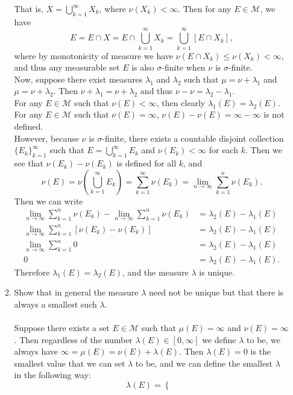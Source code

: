 \begin{enumerate}
\begin{enumerate}[label=(\roman*),align=left]
		That is, $X=\bigcup_{k=1}^\infty X_k$, where $\nu(X_k)<\infty$.
		Then for any $E\in\mathcal{M}$, we have 
		\[
			E=E\cap X = E\cap \bigcup_{k=1}^\infty X_k = \bigcup_{k=1}^\infty[E\cap X_k],
		\]
		where by monotonicity of measure we have $\nu(E\cap X_k)\le\nu(X_k)<\infty$, and thus any measurable set $E$ is also $\sigma$-finite when $\nu$ is $\sigma$-finite.
		\\Now, suppose there exist measures $\lambda_1$ and $\lambda_2$ such that $\mu=\nu+\lambda_1$ and $\mu=\nu+\lambda_2$.
		Then $\nu+\lambda_1=\nu+\lambda_2$ and thus $\nu-\nu=\lambda_2-\lambda_1$.
		\\For any $E\in\mathcal{M}$ such that $\nu(E)<\infty$, then clearly $\lambda_1(E)=\lambda_2(E)$.
		\\For any $E\in\mathcal{M}$ such that $\nu(E)=\infty$, $\nu(E)-\nu(E)=\infty-\infty$ is not defined. 
		\\However, because $\nu$ is $\sigma$-finite, there exists a countable disjoint collection $\{E_k\}_{k=1}^\infty$ such that $E=\bigcup_{k=1}^\infty E_k$ and $\nu(E_k)<\infty$ for each $k$. 
		Then we see that $\nu(E_k)-\nu(E_k)$ is defined for all $k$, and
		\[
			\nu(E)=\nu(\bigcup_{k=1}^\infty E_k)=\sum_{k=1}^\infty \nu(E_k)=\lim_{n\to\infty}\sum_{k=1}^n \nu(E_k).
		\] 
		Then we can write 
		\begin{align*}
			\lim_{n\to\infty}\sum_{k=1}^n \nu(E_k)-\lim_{n\to\infty}\sum_{k=1}^n \nu(E_k)&=\lambda_2(E)-\lambda_1(E)\\
			\lim_{n\to\infty}\sum_{k=1}^n [\nu(E_k)-\nu(E_k)]&=\lambda_2(E)-\lambda_1(E)\\
			\lim_{n\to\infty}\sum_{k=1}^n 0&=\lambda_2(E)-\lambda_1(E)\\
			0&=\lambda_2(E)-\lambda_1(E).
		\end{align*}
		Therefore $\lambda_1(E)=\lambda_2(E)$, and the measure $\lambda$ is unique.
		\item Show that in general the measure $\lambda$ need not be unique but that there is always a smallest such $\lambda$.\\
		\\Suppose there exists a set $E\in\mathcal{M}$ such that $\mu(E)=\infty$ and $\nu(E)=\infty$. 
		Then regardless of the number $\lambda(E)\in[0,\infty]$ we define $\lambda$ to be, we always have $\infty=\mu(E)=\nu(E)+\lambda(E)$.
		Then $\lambda(E)=0$ is the smallest value that we can set $\lambda$ to be, and we can define the smallest $\lambda$ in the following way:
		\[
		\lambda(E)=
		\begin{cases}

\end{cases}\]
\end{enumerate}
\end{enumerate}
